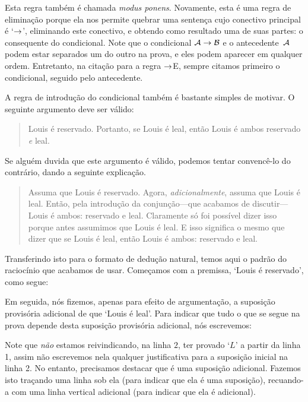  Esta regra também é chamada  \emph{modus ponens}. Novamente, esta é uma regra de eliminação porque ela nos permite quebrar uma sentença cujo conectivo principal é `$\rightarrow$', eliminando este conectivo, e obtendo como resultado uma de suas partes: o consequente do condicional.
 Note que o condicional  $\mathcal{A}\rightarrow\mathcal{B}$ e o antecedente~$\mathcal{A}$ podem estar separados um do outro na prova, e eles podem aparecer em qualquer ordem. Entretanto, na citação para a regra $\rightarrow$E, sempre citamos primeiro o condicional, seguido pelo antecedente. 

A regra de introdução do condicional também é bastante simples de motivar.  O seguinte argumento deve ser válido:
	\begin{quote}
		Louis é reservado.    Portanto, se Louis é leal, então Louis é ambos  reservado \emph{e} leal.
	\end{quote}
Se alguém duvida que este argumento é válido, podemos tentar convencê-lo do contrário, dando a seguinte explicação.
	\begin{quote}
		Assuma que  Louis é reservado.  Agora, \emph{adicionalmente}, assuma que Louis é leal.  Então, pela introdução da conjunção---que acabamos de discutir---Louis é ambos: reservado e leal.  Claramente só foi possível dizer isso porque antes assumimos que Louis é leal. E isso significa o mesmo que dizer que se Louis é leal, então Louis é ambos: reservado e leal.
	\end{quote}
Transferindo isto para o formato de dedução natural,  temos aqui o padrão do raciocínio  que acabamos de usar.  Começamos com a premissa, `Louis é reservado',  como segue: 

 
	\begin{fitchproof}
	\end{fitchproof}
Em seguida, nós fizemos, apenas para efeito de argumentação, a suposição provisória adicional de que ‘Louis é leal’. Para indicar que tudo o que se segue na prova depende desta suposição provisória adicional, nós escrevemos:

	\begin{fitchproof}
		\hypo{r}{R}
		\open
			\hypo{l}{L}
	\end{fitchproof}
Note que \emph{não}  estamos reivindicando, na linha $2$, ter provado  `$L$' a partir da linha 1, assim não escrevemos nela qualquer justificativa para a suposição inicial na linha 2. No entanto, precisamos destacar que é uma suposição adicional. Fazemos isto traçando uma linha sob ela (para indicar que ela é uma suposição), recuando-a com uma linha vertical adicional (para indicar que ela é adicional).

